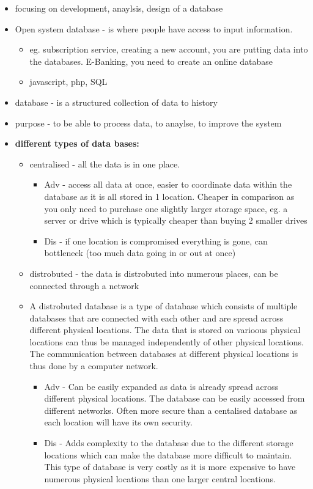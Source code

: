 \documentclass[12pt, a4, twoside]{article}
\begin{document}
\begin{center}
  \begin{itemize}
    \item focusing on development, anaylsis, design of a database 
    \item Open system database - is where people have access to input information. 
    \begin{itemize}
      \item eg. subscription service, creating a new account, you are putting data into the databases. E-Banking, you need to create an online database
      \item javascript, php, SQL
    \end{itemize}
    \item database - is a structured collection of data to history 
    \item purpose - to be able to process data, to anaylse, to improve the system
    \item \textbf{different types of data bases:}
    \begin{itemize}
      \item centralised - all the data is in one place. 
      \begin{itemize}
        \item Adv - access all data at once, easier to coordinate data within the database as it is all stored in 1 location. Cheaper in comparison as you only need to purchase one slightly larger storage space, eg. a server or drive which is typically cheaper than buying 2 smaller drives 
        \item Dis - if one location is compromised everything is gone, can bottleneck (too much data going in or out at once)
      \end{itemize}
      \item distrobuted - the data is distrobuted into numerous places, can be connected through a network
      \item A distrobuted database is a type of database which consists of multiple databases that are connected with each other and are spread across different physical locations. The data that is stored on varioous physical locations can thus be managed independently of other physical locations. The communication between databases at different physical locations is thus done by a computer network. 
      \begin{itemize}
        \item Adv - Can be easily expanded as data is already spread across different physical locations. The database can be easily accessed from different networks. Often more secure than a centalised database as each location will have its own security. 
        \item Dis - Adds complexity to the database due to the different storage locations which can make the database more difficult to maintain. This type of database is very costly as it is more expensive to have numerous physical locations than one larger central locations. 
      \end{itemize}
    \end{itemize}


\end{itemize}
\end{center}
\end{document}
